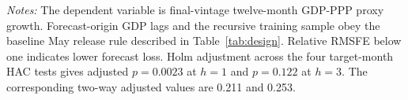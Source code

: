\begin{table}[htbp]
\centering\scriptsize
\caption{Publication-lagged forecast performance of the GRE-augmented model}
\label{tab:main_results}
\vspace{0.35em}
\begin{minipage}{0.97\textwidth}\footnotesize\textit{Notes:} The dependent variable is final-vintage twelve-month GDP-PPP proxy growth. Forecast-origin GDP lags and the recursive training sample obey the baseline May release rule described in Table~\ref{tab:design}. Relative RMSFE below one indicates lower forecast loss. Holm adjustment across the four target-month HAC tests gives adjusted $p=0.0023$ at $h=1$ and $p=0.122$ at $h=3$. The corresponding two-way adjusted values are 0.211 and 0.253.\end{minipage}
\end{table}
